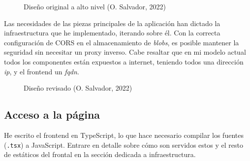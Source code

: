 \documentclass[11pt]{article}
\begin{document}
\begin{flushleft}
	\begin{figure}[htb]
		\centering
		\caption{Diseño original a alto nivel (O. Salvador, 2022)}
	\end{figure}

Las necesidades de las piezas principales de la aplicación han dictado la infraestructura que he implementado, iterando sobre él. Con la correcta configuración de CORS en el almacenamiento de \textit{\gls{blob}s}, es posible mantener la seguridad sin necesitar un proxy inverso. Cabe resaltar que en mi modelo actual todos los componentes están expuestos a internet, teniendo todos una dirección \textit{\acrshort{ip}}, y el frontend un \textit{\acrshort{fqdn}}.
\linebreak

	\begin{figure}[htb]
		\centering
		\caption{Diseño revisado (O. Salvador, 2022)}
		\label{alto_nivel}
	\end{figure}


	\subsection{Acceso a la página}
	He escrito el frontend en TypeScript, lo que hace necesario compilar los fuentes (\texttt{.tsx}) a JavaScript. Entrare en detalle sobre cómo son servidos estos y el resto de estáticos del frontal en la sección dedicada a infraestructura. 
	\linebreak
	

\end{flushleft}
\end{document}
